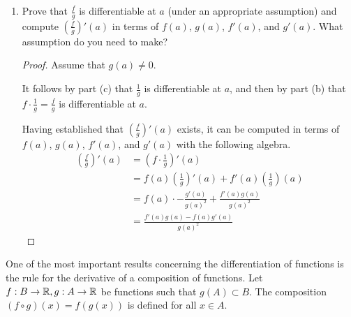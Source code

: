 \documentclass[../main.tex]{subfiles}
\begin{document}
\begin{exercise}
\begin{enumerate}[label={(\alph*)}]
\begin{proof}
        \end{proof}
        \item Prove that $\frac{f}{g}$ is differentiable at $a$ (under an appropriate assumption) and compute $(\frac{f}{g})'(a)$ in terms of $f(a)$, $g(a)$, $f'(a)$, and $g'(a)$. What assumption do you need to make?
        \begin{proof}
            Assume that $g(a)\neq 0$.\par
            It follows by part (c) that $\frac{1}{g}$ is differentiable at $a$, and then by part (b) that $f\cdot\frac{1}{g}=\frac{f}{g}$ is differentiable at $a$.\par
            Having established that $(\frac{f}{g})'(a)$ exists, it can be computed in terms of $f(a)$, $g(a)$, $f'(a)$, and $g'(a)$ with the following algebra.
            \begin{align*}
                \left( \frac{f}{g} \right)'(a) &= \left( f\cdot\frac{1}{g} \right)'(a)\\
                &= f(a)\left( \frac{1}{g} \right)'(a)+f'(a)\left( \frac{1}{g} \right)(a)\\
                &= f(a)\cdot -\frac{g'(a)}{g(a)^2}+\frac{f'(a)g(a)}{g(a)^2}\\
                &= \frac{f'(a)g(a)-f(a)g'(a)}{g(a)^2}
            \end{align*}
        \end{proof}
    \end{enumerate}
\end{exercise}

One of the most important results concerning the differentiation of functions is the rule for the derivative of a composition of functions. Let $f:B\to\mathbb{R},g:A\to\mathbb{R}$ be functions such that $g(A)\subset B$. The composition $(f\circ g)(x)=f(g(x))$ is defined for all $x\in A$.
\end{document}
